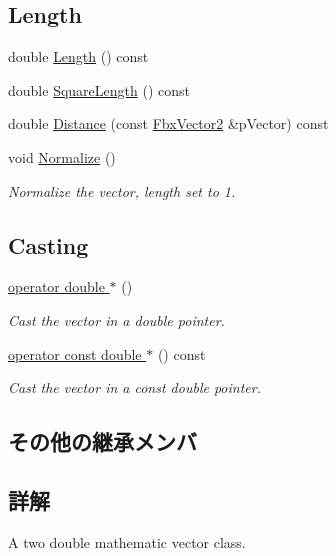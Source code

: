 \subsection*{Length}
\begin{DoxyCompactItemize}
\item 
double \hyperlink{class_fbx_vector2_ad49dcb1601d78cee3d50509f5b08ecd4}{Length} () const
\item 
double \hyperlink{class_fbx_vector2_ab0ca231fe7ccb6eb044c9e48f105cbcf}{Square\+Length} () const
\item 
double \hyperlink{class_fbx_vector2_a95b732ce313c7afc59b5e7f4f804a955}{Distance} (const \hyperlink{class_fbx_vector2}{Fbx\+Vector2} \&p\+Vector) const
\item 
void \hyperlink{class_fbx_vector2_a40ac8ab130c716a8ecf30634a168751f}{Normalize} ()
\begin{DoxyCompactList}\small\item\em Normalize the vector, length set to 1. \end{DoxyCompactList}\end{DoxyCompactItemize}
\subsection*{Casting}
\begin{DoxyCompactItemize}
\item 
\hyperlink{class_fbx_vector2_ada2a29fdcddde9235505716bd2b2d756}{operator double $\ast$} ()
\begin{DoxyCompactList}\small\item\em Cast the vector in a double pointer. \end{DoxyCompactList}\item 
\hyperlink{class_fbx_vector2_aa3d10afdd6d8efcf92a5c19132130f66}{operator const double $\ast$} () const
\begin{DoxyCompactList}\small\item\em Cast the vector in a const double pointer. \end{DoxyCompactList}\end{DoxyCompactItemize}
\subsection*{その他の継承メンバ}


\subsection{詳解}
A two double mathematic vector class. 

